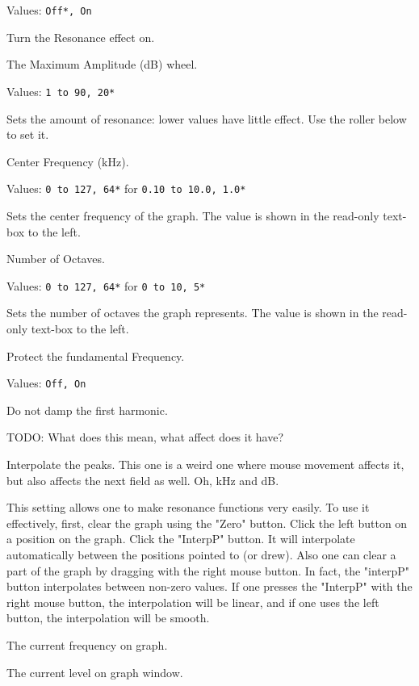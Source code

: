    Values: \texttt{Off*, On}

   Turn the Resonance effect on.

   The Maximum Amplitude (dB) wheel.

   Values: \texttt{1 to 90, 20*}

   Sets the amount of resonance: lower values have little effect. Use the
   roller below to set it. 

   Center Frequency (kHz).

   Values: \texttt{0 to 127, 64*} for \texttt{0.10 to 10.0, 1.0*}

   Sets the center frequency of the graph.
   The value is shown in the read-only text-box to the left.

   Number of Octaves.

   Values: \texttt{0 to 127, 64*} for \texttt{0 to 10, 5*}

   Sets the number of octaves the graph represents.
   The value is shown in the read-only text-box to the left.

   Protect the fundamental Frequency.

   Values: \texttt{Off, On}

   Do not damp the first harmonic.

   TODO:  What does this mean, what affect does it have?

   Interpolate the peaks.
   This one is a weird one where mouse movement affects it,
   but also affects the next field as well.  Oh, kHz and dB.

   This setting allows one to make resonance functions very easily.
   To use it effectively, first,
   clear the graph using the "Zero" button. Click the left button on a
   position on the graph. Click the "InterpP" button. It will interpolate
   automatically between the positions pointed to (or drew).  Also one can
   clear a part of the graph by dragging with the right mouse button. In
   fact, the "interpP" button interpolates between non-zero values.  If one
   presses the "InterpP" with the right mouse button, the interpolation will
   be linear, and if one uses the left button, the interpolation will be
   smooth. 

   The current frequency on graph.

   The current level on graph window.

